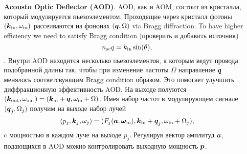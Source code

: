 
\textbf{Acousto Optic Deflector (AOD)}. AOD, как и AOM, состоит из кристалла, который модулируется пьезоэлементом. Проходящие через кристалл фотоны $(\boldsymbol{k}_{\textnormal{in}}, \omega_{\textnormal{in}})$ рассеиваются на фононах $(\boldsymbol{q}, \Omega)$ via Bragg diffraction. To have higher efficiency we need to satisfy Bragg condition (проверить и добавить источник)
\begin{equation*}
	n_{\textnormal{sc}} q = k_{\textnormal{in}} \sin(\theta),
\end{equation*}
 . Внутри AOD находится несколько пьезоэлементов, к которым ведут провода подобранной длины так, чтобы при изменение частоты $\Omega$ направление $\boldsymbol{q}$ менялось соответсвующим Bragg condition образом. Это помогает улучшить диффракционную эффективность  AOD. На выходе полуются $(\boldsymbol{k}_{\textnormal{out}}, \omega_{\textnormal{out}}) = (\boldsymbol{k}_{\textnormal{in}}+\boldsymbol{q}, \omega_{\textnormal{in}} + \Omega)$. 
Имея набор частот в модулирующем сигнале $(\boldsymbol{q}_j, \Omega_j)$ получим на выходе набор лучей
\begin{equation*}
	(p_j, \boldsymbol{k}_j, \omega_j) = (F_j(\boldsymbol{a}, \boldsymbol{\omega}_{\textnormal{in}}), \boldsymbol{k}_{\textnormal{in}}+\boldsymbol{q}_j, \omega_{\textnormal{in}} + \Omega_j),
\end{equation*}
c мощностью в каждом луче на выходе $p_j$. Регулируя вектор амплитуд $\boldsymbol{a}$, подающихся в AOD можно контролировать выходную мощность $\boldsymbol{p}$. 

